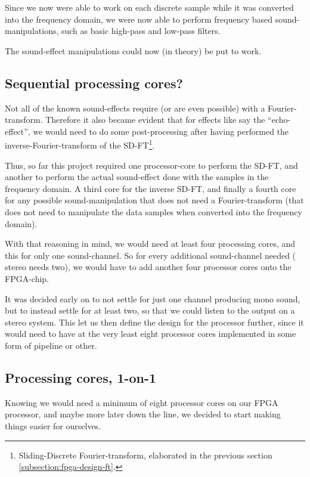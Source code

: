 Since we now were able to work on each discrete sample while it was converted
into the frequency domain, we were now able to perform frequency based
sound-manipulations, such as basic high-pass and low-pass filters.

The sound-effect manipulations could now (in theory) be put to work.

\FloatBarrier
\subsection{Sequential processing cores?}

Not all of the known sound-effects require (or are even possible) with a
Fourier-transform. Therefore it also became evident that for effects like say
the ``echo-effect'', we would need to do some post-processing after having
performed the inverse-Fourier-transform of the SD-FT\footnote{Sliding-Discrete
Fourier-transform, elaborated in the previous section
\ref{subsection:fpga-design-ft}.}.

Thus, so far this project required one processor-core to perform the SD-FT, and
another to perform the actual sound-effect done with the samples in the
frequency domain. A third core for the inverse SD-FT, and finally a fourth core
for any possible sound-manipulation that does not need a Fourier-transform (that
does not need to manipulate the data samples when converted into the frequency
domain).

With that reasoning in mind, we would need at least four processing cores, and
this for only one sound-channel. So for every additional sound-channel needed (
stereo needs two), we would have to add another four processor cores onto the
FPGA-chip.

It was decided early on to not settle for just one channel producing mono sound,
but to instead settle for at least two, so that we could listen to the output
on a stereo system. This let us then define the design for the processor
further, since it would need to have at the very least eight processor cores
implemented in some form of pipeline or other.

\subsection{Processing cores, 1-on-1}

Knowing we would need a minimum of eight processor cores on our FPGA processor,
and maybe more later down the line, we decided to start making things easier
for ourselves.

